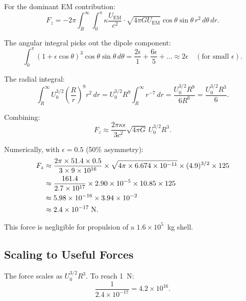 \documentclass[amsmath,amssymb,aps,prd,superscriptaddress,nofootinbib]{revtex4-2}
\newcommand{\ka}{\kappa}
\begin{document}
For the dominant EM contribution:
\begin{equation}
F_z = -2\pi \int_R^\infty \int_0^\pi \ka \frac{U_\text{EM}}{c^2}
\cdot \sqrt{4\pi G U_\text{EM}} \cos\theta \sin\theta \, r^2 \, d\theta \, dr.
\end{equation}

The angular integral picks out the dipole component:
\begin{equation}
\int_0^\pi (1 + \epsilon\cos\theta)^3 \cos\theta \sin\theta \, d\theta
= \frac{2\epsilon}{1} + \frac{6\epsilon}{5} + \ldots \approx 2\epsilon
\quad (\text{for small } \epsilon).
\end{equation}

The radial integral:
\begin{equation}
\int_R^\infty U_0^{3/2} \left(\frac{R}{r}\right)^9 r^2 \, dr
= U_0^{3/2} R^9 \int_R^\infty r^{-7} \, dr = \frac{U_0^{3/2} R^9}{6 R^6}
= \frac{U_0^{3/2} R^3}{6}.
\end{equation}

Combining:
\begin{equation}\label{eq:net-force}
\boxed{
F_z \approx \frac{2\pi \ka \epsilon}{3 c^2} \sqrt{4\pi G} \, U_0^{3/2} R^3.
}
\end{equation}

Numerically, with $\epsilon = 0.5$ (50\% asymmetry):
\begin{align}
F_z &\approx \frac{2\pi \times 51.4 \times 0.5}{3 \times 9 \times 10^{16}}
\times \sqrt{4\pi \times 6.674 \times 10^{-11}} \times (4.9)^{3/2} \times 125 \notag \\
&\approx \frac{161.4}{2.7 \times 10^{17}} \times 2.90 \times 10^{-5} \times 10.85 \times 125 \notag \\
&\approx 5.98 \times 10^{-16} \times 3.94 \times 10^{-2} \notag \\
&\approx 2.4 \times 10^{-17} \; \si{N}.
\end{align}

This force is negligible for propulsion of a $1.6 \times 10^5$~kg shell.

\subsection{Scaling to Useful Forces}

The force scales as $U_0^{3/2} R^3$. To reach 1~N:
\begin{equation}
\frac{1}{2.4 \times 10^{-17}} = 4.2 \times 10^{16}.
\end{equation}
\end{document}
